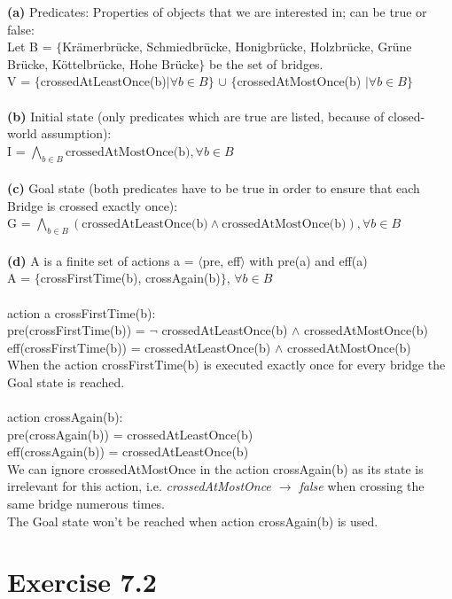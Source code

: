 \documentclass[12pt]{article}
\begin{document}
\textbf{(a)} Predicates: Properties of objects that we are interested in; can be true or false:\\
Let B = $\{$Krämerbrücke, Schmiedbrücke, Honigbrücke, Holzbrücke, Grüne Brücke, Köttelbrücke, Hohe Brücke$\}$ be the set of bridges.\\
V = $\{$crossedAtLeastOnce(b)$\mid \forall b \in B \}$ $\cup$ $\{$crossedAtMostOnce(b) $\mid \forall b \in B\}$\\\\
\textbf{(b)} Initial state (only predicates which are true are listed, because of closed-world assumption):\\
I = $\bigwedge_{b\in B} \textrm{crossedAtMostOnce(b)}, \forall b \in B$\\\\
\textbf{(c)} Goal state (both predicates have to be true in order to ensure that each Bridge is crossed exactly once):\\
G = $\bigwedge_{b\in B} \left(\textrm{crossedAtLeastOnce(b)} \land \textrm{crossedAtMostOnce(b)} \right), \forall b \in B$\\\\
\textbf{(d)} A is a finite set of actions a = $\langle$pre, eff$\rangle$ with pre(a) and eff(a)\\
A = $\{$crossFirstTime(b), crossAgain(b)$\}$, $\forall b \in B$\\\\
action a crossFirstTime(b):\\
pre(crossFirstTime(b)) = $\neg$ crossedAtLeastOnce(b) $\land$ crossedAtMostOnce(b)\\
eff(crossFirstTime(b)) = crossedAtLeastOnce(b) $\land$ crossedAtMostOnce(b)\\
When the action crossFirstTime(b) is executed exactly once for every bridge the Goal state is reached.\\\\
action crossAgain(b):\\
pre(crossAgain(b)) = crossedAtLeastOnce(b)\\
eff(crossAgain(b)) = crossedAtLeastOnce(b)\\
We can ignore crossedAtMostOnce in the action crossAgain(b) as its state is irrelevant for this action, i.e. \emph{crossedAtMostOnce $\to$ false} when crossing the same bridge numerous times.\\
The Goal state won't be reached when action crossAgain(b) is used.\pagebreak

\section*{Exercise 7.2}
\end{document}
